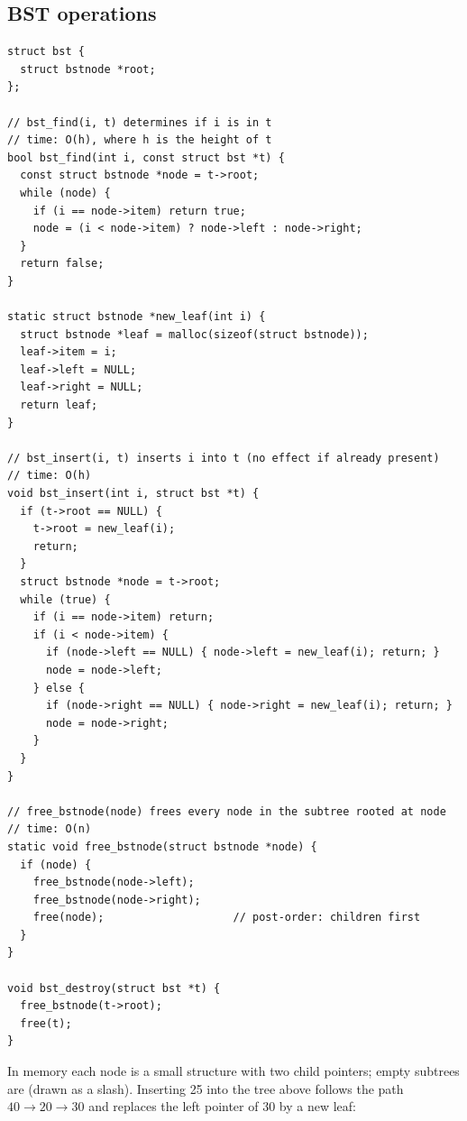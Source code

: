 \subsection{BST operations}
\begin{lstlisting}[style=c]
struct bst {
  struct bstnode *root;
};

// bst_find(i, t) determines if i is in t
// time: O(h), where h is the height of t
bool bst_find(int i, const struct bst *t) {
  const struct bstnode *node = t->root;
  while (node) {
    if (i == node->item) return true;
    node = (i < node->item) ? node->left : node->right;
  }
  return false;
}

static struct bstnode *new_leaf(int i) {
  struct bstnode *leaf = malloc(sizeof(struct bstnode));
  leaf->item = i;
  leaf->left = NULL;
  leaf->right = NULL;
  return leaf;
}

// bst_insert(i, t) inserts i into t (no effect if already present)
// time: O(h)
void bst_insert(int i, struct bst *t) {
  if (t->root == NULL) {
    t->root = new_leaf(i);
    return;
  }
  struct bstnode *node = t->root;
  while (true) {
    if (i == node->item) return;
    if (i < node->item) {
      if (node->left == NULL) { node->left = new_leaf(i); return; }
      node = node->left;
    } else {
      if (node->right == NULL) { node->right = new_leaf(i); return; }
      node = node->right;
    }
  }
}

// free_bstnode(node) frees every node in the subtree rooted at node
// time: O(n)
static void free_bstnode(struct bstnode *node) {
  if (node) {
    free_bstnode(node->left);
    free_bstnode(node->right);
    free(node);                    // post-order: children first
  }
}

void bst_destroy(struct bst *t) {
  free_bstnode(t->root);
  free(t);
}
\end{lstlisting}

In memory each node is a small structure with two child pointers; empty
subtrees are  (drawn as a slash). Inserting 25 into the tree above
follows the path $40 \to 20 \to 30$ and replaces the  left pointer of 30 by a
new leaf:

